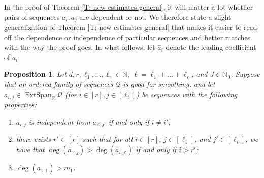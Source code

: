 \documentclass[11pt]{amsart}
\newtheorem{proposition}[lemma]{Proposition}
\theoremstyle{definition}
\newcommand{\N}{{\mathbb N}}
\newcommand{\R}{{\mathbb R}}
\newcommand{\CQ}{{\mathcal Q}}
\newcommand{\1}{{\mathbf{1}}}
\DeclareMathOperator{\Span}{Span}
\DeclareMathOperator{\extSpan}{ExtSpan}
\begin{document}
In the proof of Theorem \ref{T: new estimates general}, it will matter a lot whether pairs of sequences $a_i, a_j$ are dependent or not. We therefore state a slight generalization of Theorem \ref{T: new estimates general} that makes it easier to read off the dependence or independence of particular sequences and better matches with the way the proof goes. In what follows, let $\hat{a}_{i}$ denote the leading coefficient of $a_{i}$. %
     
     \begin{proposition}\label{newestimate3}
        Let $d, r, \ell_{1},\dots,\ell_{r}\in\N$, $\ell=\ell_{1}+\dots+\ell_{r}$, and $J\in\N_0$. Suppose that an ordered family of sequences $\CQ$
        is {good for smoothing}, and let $a_{i,j}\in\extSpan_\R \CQ$ (for $i\in[r], j\in[\ell_i]$) be sequences
        with the following properties:
        \begin{enumerate}
             \item $a_{i,j}$ is independent from $a_{i',j'}$ if and only if $i\neq i'$;
              \item %
              there exists $r'\in[r]$ such that for all $i\in[r]$, $j\in[\ell_1]$, and $j'\in[\ell_i]$, we have that $\deg(a_{1,j})>\deg(a_{i,j'})$ if and only if $i>r'$;
             \item $\deg(a_{1,1})>m_{1}$.
        \end{enumerate}


\end{proposition}
\end{document}
